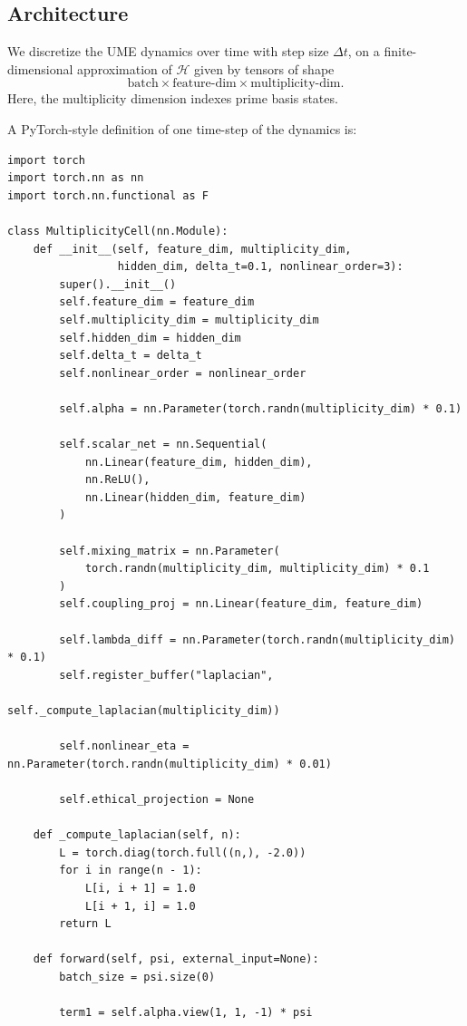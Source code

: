 \documentclass[11pt]{article}
\begin{document}
\subsection{Architecture}

We discretize the UME dynamics over time with step size $\Delta t$, on a finite-dimensional approximation of $\mathcal{H}$ given by tensors of shape
\[
\text{batch} \times \text{feature-dim} \times \text{multiplicity-dim}.
\]
Here, the multiplicity dimension indexes prime basis states.

A PyTorch-style definition of one time-step of the dynamics is:

\begin{verbatim}
import torch
import torch.nn as nn
import torch.nn.functional as F

class MultiplicityCell(nn.Module):
    def __init__(self, feature_dim, multiplicity_dim,
                 hidden_dim, delta_t=0.1, nonlinear_order=3):
        super().__init__()
        self.feature_dim = feature_dim
        self.multiplicity_dim = multiplicity_dim
        self.hidden_dim = hidden_dim
        self.delta_t = delta_t
        self.nonlinear_order = nonlinear_order

        self.alpha = nn.Parameter(torch.randn(multiplicity_dim) * 0.1)

        self.scalar_net = nn.Sequential(
            nn.Linear(feature_dim, hidden_dim),
            nn.ReLU(),
            nn.Linear(hidden_dim, feature_dim)
        )

        self.mixing_matrix = nn.Parameter(
            torch.randn(multiplicity_dim, multiplicity_dim) * 0.1
        )
        self.coupling_proj = nn.Linear(feature_dim, feature_dim)

        self.lambda_diff = nn.Parameter(torch.randn(multiplicity_dim) * 0.1)
        self.register_buffer("laplacian",
                             self._compute_laplacian(multiplicity_dim))

        self.nonlinear_eta = nn.Parameter(torch.randn(multiplicity_dim) * 0.01)

        self.ethical_projection = None

    def _compute_laplacian(self, n):
        L = torch.diag(torch.full((n,), -2.0))
        for i in range(n - 1):
            L[i, i + 1] = 1.0
            L[i + 1, i] = 1.0
        return L

    def forward(self, psi, external_input=None):
        batch_size = psi.size(0)

        term1 = self.alpha.view(1, 1, -1) * psi


\end{verbatim}
\end{document}
